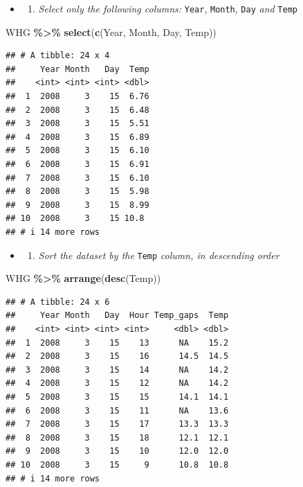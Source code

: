 \documentclass[
]{article}
\newenvironment{Shaded}{\begin{snugshade}}{\end{snugshade}}
\newcommand{\FunctionTok}[1]{\textcolor[rgb]{0.13,0.29,0.53}{\textbf{#1}}}
\newcommand{\NormalTok}[1]{#1}
\newcommand{\SpecialCharTok}[1]{\textcolor[rgb]{0.81,0.36,0.00}{\textbf{#1}}}
\providecommand{\tightlist}{%
  \setlength{\itemsep}{0pt}\setlength{\parskip}{0pt}}
\begin{document}
\begin{itemize}
\tightlist
\item
  \begin{enumerate}
  \def\labelenumi{\alph{enumi})}
  \setcounter{enumi}{5}
  \tightlist
  \item
    \emph{Select only the following columns:} \texttt{Year}, \texttt{Month}, \texttt{Day} \emph{and} \texttt{Temp}
  \end{enumerate}
\end{itemize}

\begin{Shaded}
\begin{Highlighting}[]
\NormalTok{WHG }\SpecialCharTok{\%\textgreater{}\%} \FunctionTok{select}\NormalTok{(}\FunctionTok{c}\NormalTok{(Year, Month, Day, Temp))}
\end{Highlighting}
\end{Shaded}

\begin{verbatim}
## # A tibble: 24 x 4
##     Year Month   Day  Temp
##    <int> <int> <int> <dbl>
##  1  2008     3    15  6.76
##  2  2008     3    15  6.48
##  3  2008     3    15  5.51
##  4  2008     3    15  6.89
##  5  2008     3    15  6.10
##  6  2008     3    15  6.91
##  7  2008     3    15  6.10
##  8  2008     3    15  5.98
##  9  2008     3    15  8.99
## 10  2008     3    15 10.8 
## # i 14 more rows
\end{verbatim}

\begin{itemize}
\tightlist
\item
  \begin{enumerate}
  \def\labelenumi{\alph{enumi})}
  \setcounter{enumi}{6}
  \tightlist
  \item
    \emph{Sort the dataset by the} \texttt{Temp} \emph{column, in descending order}
  \end{enumerate}
\end{itemize}

\begin{Shaded}
\begin{Highlighting}[]
\NormalTok{WHG }\SpecialCharTok{\%\textgreater{}\%} \FunctionTok{arrange}\NormalTok{(}\FunctionTok{desc}\NormalTok{(Temp))}
\end{Highlighting}
\end{Shaded}

\begin{verbatim}
## # A tibble: 24 x 6
##     Year Month   Day  Hour Temp_gaps  Temp
##    <int> <int> <int> <int>     <dbl> <dbl>
##  1  2008     3    15    13      NA    15.2
##  2  2008     3    15    16      14.5  14.5
##  3  2008     3    15    14      NA    14.2
##  4  2008     3    15    12      NA    14.2
##  5  2008     3    15    15      14.1  14.1
##  6  2008     3    15    11      NA    13.6
##  7  2008     3    15    17      13.3  13.3
##  8  2008     3    15    18      12.1  12.1
##  9  2008     3    15    10      12.0  12.0
## 10  2008     3    15     9      10.8  10.8
## # i 14 more rows
\end{verbatim}
\end{document}
